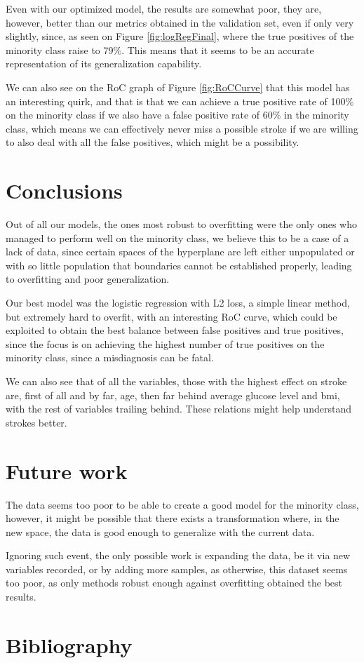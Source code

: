 \documentclass[11pt, a4paper]{article}
\begin{document}
Even with our optimized model, the results are somewhat poor, they are, however, better than our metrics obtained in the validation set, even if only very slightly, since, as seen on Figure \ref{fig:logRegFinal}, where the true positives of the minority class raise to 79\%. This means that it seems to be an accurate representation of its generalization capability.

 We can also see on the RoC graph of Figure \ref{fig:RoCCurve} that this model has an interesting quirk, and that is that we can achieve a true positive rate of 100\% on the minority class if we also have a false positive rate of 60\% in the minority class, which means we can effectively never miss a possible stroke if we are willing to also deal with all the false positives, which might be a possibility.


\section{Conclusions}

Out of all our models, the ones most robust to overfitting were the only ones who managed to perform well on the minority class, we believe this to be a case of a lack of data, since certain spaces of the hyperplane are left either unpopulated or with so little population that boundaries cannot be established properly, leading to overfitting and poor generalization.

Our best model was the logistic regression with L2 loss, a simple linear method, but extremely hard to overfit, with an interesting RoC curve, which could be exploited to obtain the best balance between false positives and true positives, since the focus is on achieving the highest number of true positives on the minority class, since a misdiagnosis can be fatal.

We can also see that of all the variables, those with the highest effect on stroke are, first of all and by far, age, then far behind average glucose level and bmi, with the rest of variables trailing behind. These relations might help understand strokes better.



\section{Future work}

The data seems too poor to be able to create a good model for the minority class, however, it might be possible that there exists a transformation where, in the new space, the data is good enough to generalize with the current data.

Ignoring such event, the only possible work is expanding the data, be it via new variables recorded, or by adding more samples, as otherwise, this dataset seems too poor, as only methods robust enough against overfitting obtained the best results.

\section{Bibliography}
\printbibliography
\end{document}
